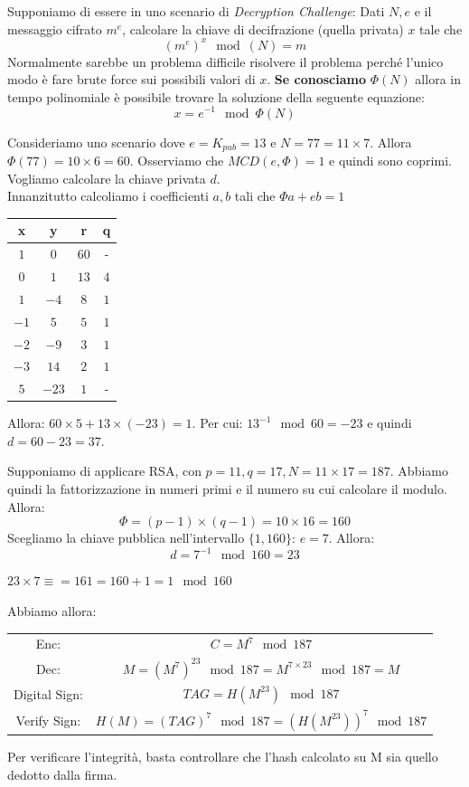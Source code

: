 \begin{example}
Supponiamo di essere in uno scenario di \textit{Decryption Challenge}: Dati $N,e$ e il messaggio cifrato $m^e$, calcolare la chiave di decifrazione (quella privata) $x$ tale che \[(m^e)^x\mod(N)=m\]
Normalmente sarebbe un problema difficile risolvere il problema perché l'unico modo è fare brute force sui possibili valori di $x$. \textbf{Se conosciamo} $\Phi(N)$ allora in tempo polinomiale è possibile trovare la soluzione della seguente equazione:
\[x=e^{-1}\mod\Phi(N)\]
\end{example}
\begin{example}
Consideriamo uno scenario dove $e=K_{pub}=13$ e $N=77=11\times7$. Allora $\Phi(77)=10\times6=60$. Osserviamo che $MCD(e,\Phi)=1$ e quindi sono coprimi. Vogliamo calcolare la chiave privata $d$.\\
Innanzitutto calcoliamo i coefficienti $a,b$ tali che $\Phi a+eb=1$
\begin{center}
\begin{tabular}{|c|c|c|c|}
\hline
    x & y & r & q \\
\hline
    $1$ & $0$ & $60$& - \\ 
\hline
    $0$ & $1$ & $13$& $4$\\
 \hline
    $1$ & $-4$ & $8$ & $1$  \\
\hline
    $-1$ & $5$ & $5$ & $1$\\
\hline
    $-2$ & $-9$ & $3$ & $1$\\
\hline
    $-3$ & $14$& $2$&$1$\\
\hline
    $5$ & $-23$ & $1$ & -\\
\hline
\end{tabular}
\end{center}
Allora: $60\times5+13\times(-23)=1$. Per cui: $13^{-1}\mod60=-23$ e quindi $d=60-23=37$.
\end{example}
\begin{example}
Supponiamo di applicare RSA, con $p=11,q=17,N=11\times17=187$. Abbiamo quindi la fattorizzazione in numeri primi e il numero su cui calcolare il modulo. Allora:
\[\Phi=(p-1)\times(q-1)=10\times16=160\]
Scegliamo la chiave pubblica nell'intervallo $\{1,160\}$: $e=7$. Allora:
\[d=7^{-1}\mod160=23\]
\begin{remark}
$23\times7\equiv=161=160+1=1\mod160$
\end{remark}
Abbiamo allora:
\begin{center}
    \begin{tabular}{c c}
     Enc: & $C=M^7\mod187$ \\
     Dec: & $M=(M^7)^{23}\mod187=M^{7\times23}\mod187=M$ \\
     Digital Sign: & $TAG=H(M^{23})\mod187$\\
     Verify Sign: & $H(M)=(TAG)^7\mod187=(H(M^{23}))^7\mod187$
\end{tabular}
\end{center}
Per verificare l'integrità, basta controllare che l'hash calcolato su M sia quello dedotto dalla firma.
\end{example}
